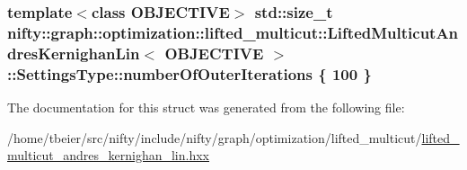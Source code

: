 \subsubsection[{number\+Of\+Outer\+Iterations}]{\setlength{\rightskip}{0pt plus 5cm}template$<$class O\+B\+J\+E\+C\+T\+I\+V\+E$>$ std\+::size\+\_\+t {\bf nifty\+::graph\+::optimization\+::lifted\+\_\+multicut\+::\+Lifted\+Multicut\+Andres\+Kernighan\+Lin}$<$ O\+B\+J\+E\+C\+T\+I\+V\+E $>$\+::Settings\+Type\+::number\+Of\+Outer\+Iterations \{ 100 \}}\label{structnifty_1_1graph_1_1optimization_1_1lifted__multicut_1_1LiftedMulticutAndresKernighanLin_1_1SettingsType_ae35728132164f566b1c30238bd39619d}


The documentation for this struct was generated from the following file\+:\begin{DoxyCompactItemize}
\item 
/home/tbeier/src/nifty/include/nifty/graph/optimization/lifted\+\_\+multicut/\hyperlink{lifted__multicut__andres__kernighan__lin_8hxx}{lifted\+\_\+multicut\+\_\+andres\+\_\+kernighan\+\_\+lin.\+hxx}\end{DoxyCompactItemize}
